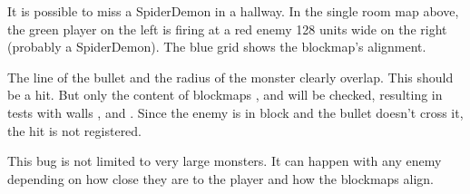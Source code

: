 \par
It is possible to miss a SpiderDemon in a hallway. In the single room map above, the green player on the left is firing at a red enemy 128 units wide on the right (probably a SpiderDemon). The blue grid shows the blockmap's alignment.\\
\par
 The line of the bullet and the radius of the monster clearly overlap. This should be a hit. But only the content of blockmaps ,  and  will be checked, resulting in tests with walls ,  and . Since the enemy is in block  and the bullet doesn't cross it, the hit is not registered.\\
 \par
 This bug is not limited to very large monsters. It can happen with any enemy depending on how close they are to the player and how the blockmaps align.







